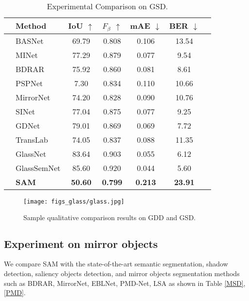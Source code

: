 \documentclass{article}
\begin{document}
\begin{table}%
    \centering
    \begin{tabular}{llccccc} %
    \toprule
    &Method & IoU $\uparrow$ &${F}_{\beta}$ $\uparrow$ & mAE $\downarrow$ &BER $\downarrow$ \\
    \midrule
    &BASNet\cite{qin2019basnet}  &69.79 &0.808 &0.106& 13.54 \\
    &MINet  \cite{pang2020multi}  &77.29 &0.879 &0.077& 9.54 \\
    &BDRAR\cite{pang2020multi} &75.92&0.860&0.081&8.61\\
    &PSPNet\cite{pang2020multi}&7.30&0.834 &0.110&10.66\\
    &MirrorNet \cite{yang2019my} &74.20 &0.828   & 0.090 & 10.76\\
    &SINet \cite{fan2020camouflaged} &77.04 &0.875&0.077 & 9.25\\&GDNet \cite{mei2020don}  &79.01 &0.869&0.069 &7.72  \\
    &TransLab\cite{xie2020segmenting} &74.05 & 0.837  &0.088  & 11.35\\
   & GlassNet \cite{lin2021rich}    &83.64 & 0.903 &0.055    & 6.12 \\
   & GlassSemNet\cite{linexploiting} &85.60 &0.920 &0.044 &5.60\\
    \midrule
   & \textbf{SAM} &\textbf{50.60} & \textbf{0.799} &\textbf{0.213} & \textbf{23.91}\\
    \bottomrule
    \end{tabular}
    \caption{Experimental Comparison on GSD. %
    }
    \vspace*{-2mm}
    \label{GSD}
\end{table}

\begin{figure*}
\centering
\texttt{[image: figs\_glass/glass.jpg]}
\caption{Sample qualitative comparison results on GDD and GSD.}
  \label{glass} 
\end{figure*}





\subsection{Experiment on mirror objects}
We compare SAM with the state-of-the-art semantic segmentation, shadow detection, saliency objects detection, and mirror objects segmentation methods such as BDRAR, MirrorNet, EBLNet, PMD-Net, LSA as shown in Table \ref{MSD}, \ref{PMD}. 
\end{document}
